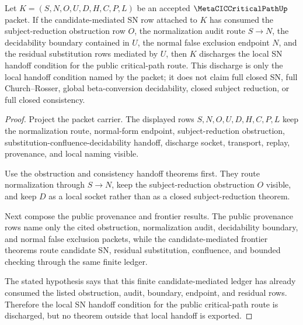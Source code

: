 \begin{theorem}
\label{thm:metacic-critical-path-candidate-mediated-sn-conditional-discharge}
Let $K=(S,N,O,U,D,H,C,P,L)$ be an accepted $\MetaCICCriticalPathUp$ packet. If the candidate-mediated SN row attached to $K$ has consumed the subject-reduction obstruction row $O$, the normalization audit route $S \to N$, the decidability boundary contained in $U$, the normal false exclusion endpoint $N$, and the residual substitution rows mediated by $U$, then $K$ discharges the local SN handoff condition for the public critical-path route. This discharge is only the local handoff condition named by the packet; it does not claim full closed SN, full Church--Rosser, global beta-conversion decidability, closed subject reduction, or full closed consistency.
\end{theorem}
\begin{proof}
Project the packet carrier. The displayed rows $S,N,O,U,D,H,C,P,L$ keep the normalization route, normal-form endpoint, subject-reduction obstruction, substitution-confluence-decidability handoff, discharge socket, transport, replay, provenance, and local naming visible.

Use the obstruction and consistency handoff theorems first. They route normalization through $S \to N$, keep the subject-reduction obstruction $O$ visible, and keep $D$ as a local socket rather than as a closed subject-reduction theorem.

Next compose the public provenance and frontier results. The public provenance rows name only the cited obstruction, normalization audit, decidability boundary, and normal false exclusion packets, while the candidate-mediated frontier theorems route candidate SN, residual substitution, confluence, and bounded checking through the same finite ledger.

The stated hypothesis says that this finite candidate-mediated ledger has already consumed the listed obstruction, audit, boundary, endpoint, and residual rows. Therefore the local SN handoff condition for the public critical-path route is discharged, but no theorem outside that local handoff is exported.
\end{proof}

